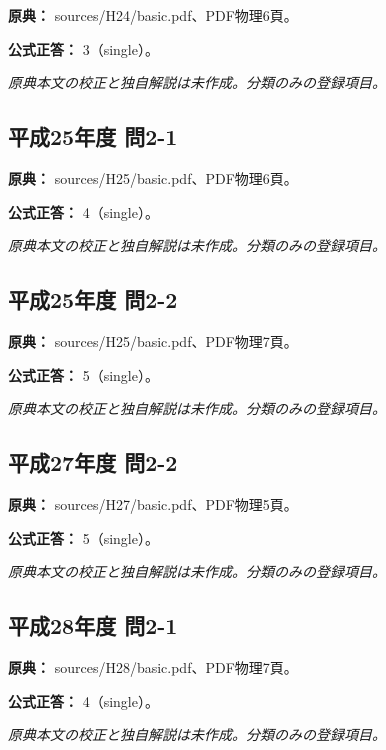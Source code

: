 \noindent\textbf{原典：} sources/H24/basic.pdf、PDF物理6頁。

\textbf{公式正答：} 3（single）。

\par\textit{原典本文の校正と独自解説は未作成。分類のみの登録項目。}

\subsection{平成25年度 問2-1}
\label{q:h25-reg-basic-2-1}

\noindent\textbf{原典：} sources/H25/basic.pdf、PDF物理6頁。

\textbf{公式正答：} 4（single）。

\par\textit{原典本文の校正と独自解説は未作成。分類のみの登録項目。}

\subsection{平成25年度 問2-2}
\label{q:h25-reg-basic-2-2}

\noindent\textbf{原典：} sources/H25/basic.pdf、PDF物理7頁。

\textbf{公式正答：} 5（single）。

\par\textit{原典本文の校正と独自解説は未作成。分類のみの登録項目。}

\subsection{平成27年度 問2-2}
\label{q:h27-reg-basic-2-2}

\noindent\textbf{原典：} sources/H27/basic.pdf、PDF物理5頁。

\textbf{公式正答：} 5（single）。

\par\textit{原典本文の校正と独自解説は未作成。分類のみの登録項目。}

\subsection{平成28年度 問2-1}
\label{q:h28-reg-basic-2-1}

\noindent\textbf{原典：} sources/H28/basic.pdf、PDF物理7頁。

\textbf{公式正答：} 4（single）。

\par\textit{原典本文の校正と独自解説は未作成。分類のみの登録項目。}

